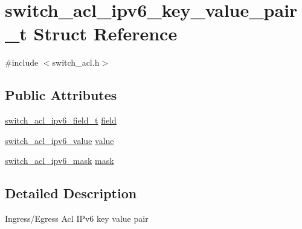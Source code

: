 \hypertarget{structswitch__acl__ipv6__key__value__pair__t}{\section{switch\+\_\+acl\+\_\+ipv6\+\_\+key\+\_\+value\+\_\+pair\+\_\+t Struct Reference}
\label{structswitch__acl__ipv6__key__value__pair__t}
}


{\ttfamily \#include $<$switch\+\_\+acl.\+h$>$}

\subsection*{Public Attributes}
\begin{DoxyCompactItemize}
\item 
\hyperlink{group__ACL_gac21b1f90cca1d5f3305169407ebfd0ed}{switch\+\_\+acl\+\_\+ipv6\+\_\+field\+\_\+t} \hyperlink{structswitch__acl__ipv6__key__value__pair__t_a9fcce09d45f8da2dbd4845e0d522ebce}{field}
\item 
\hyperlink{group__ACL_ga05073406ded139965f11ef74332add10}{switch\+\_\+acl\+\_\+ipv6\+\_\+value} \hyperlink{structswitch__acl__ipv6__key__value__pair__t_aa50e9398d181cc9c26b4ab38dfdec418}{value}
\item 
\hyperlink{group__ACL_ga598339272a82061bf0816da6e067f505}{switch\+\_\+acl\+\_\+ipv6\+\_\+mask} \hyperlink{structswitch__acl__ipv6__key__value__pair__t_a7c777a118571f3fec2f9b683659faeb9}{mask}
\end{DoxyCompactItemize}


\subsection{Detailed Description}
Ingress/\+Egress Acl I\+Pv6 key value pair 

